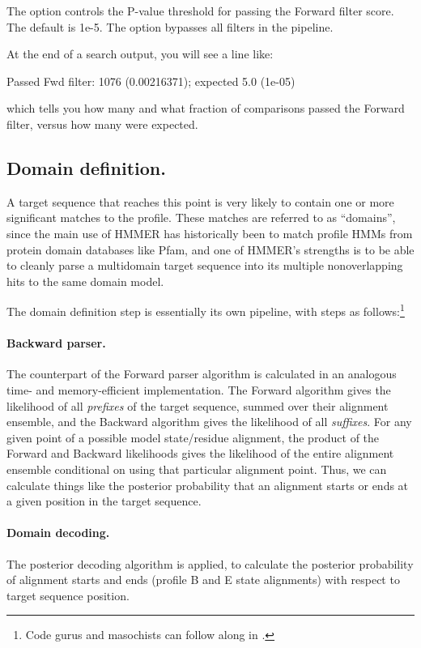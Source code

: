 The  option controls the P-value threshold for passing
the Forward filter score. The default is 1e-5.  The 
option bypasses all filters in the pipeline.

At the end of a search output, you will see a line like:

\begin{sreoutput}
Passed Fwd filter:                      1076  (0.00216371); expected 5.0 (1e-05)
\end{sreoutput}

which tells you how many and what fraction of comparisons passed the
Forward filter, versus how many were expected.


\subsection{Domain definition.}

A target sequence that reaches this point is very likely to contain
one or more significant matches to the profile. These matches are
referred to as ``domains'', since the main use of HMMER has
historically been to match profile HMMs from protein domain databases
like Pfam, and one of HMMER's strengths is to be able to cleanly parse
a multidomain target sequence into its multiple nonoverlapping hits to
the same domain model.

The domain definition step is essentially its own pipeline, with steps
as follows:\footnote{Code gurus and masochists can follow along in 
.}

\paragraph{Backward parser.}
The counterpart of the Forward parser algorithm is calculated in an
analogous time- and memory-efficient implementation. The Forward
algorithm gives the likelihood of all \emph{prefixes} of the target
sequence, summed over their alignment ensemble, and the Backward
algorithm gives the likelihood of all \emph{suffixes}. For any given
point of a possible model state/residue alignment, the product of the
Forward and Backward likelihoods gives the likelihood of the entire
alignment ensemble conditional on using that particular alignment
point. Thus, we can calculate things like the posterior probability
that an alignment starts or ends at a given position in the target
sequence.

\paragraph{Domain decoding.}
The posterior decoding algorithm is applied, to calculate the
posterior probability of alignment starts and ends (profile B and E
state alignments) with respect to target sequence position.

